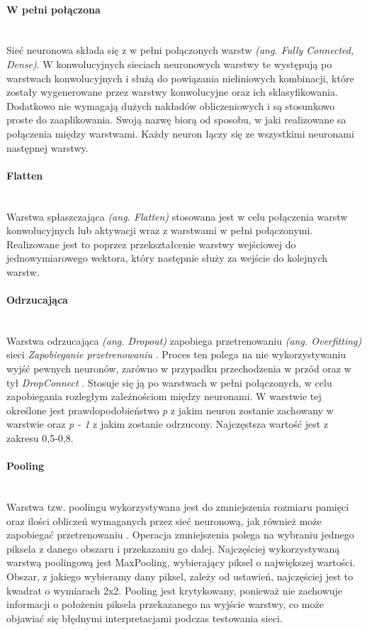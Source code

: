 \paragraph{W pełni połączona} \mbox{}\\
Sieć neuronowa składa się z w pełni połączonych warstw \textit{(ang. Fully Connected, Dense)}.
W konwolucyjnych sieciach neuronowych warstwy te występują po warstwach konwolucyjnych
i służą do powiązania nieliniowych kombinacji, które zostały wygenerowane przez
warstwy konwolucyjne oraz ich sklasyfikowania. Dodatkowo nie wymagają dużych nakładów
obliczeniowych i są stosunkowo proste do zaaplikowania. Swoją nazwę biorą od sposobu, w jaki
realizowane sa połączenia między warstwami. Każdy neuron łączy się ze wszystkimi neuronami
następnej warstwy.

\paragraph{Flatten} \mbox{}\\
Warstwa spłaszczająca \textit{(ang. Flatten)} stosowana jest w celu połączenia warstw
konwolucyjnych lub aktywacji wraz z warstwami w pełni połączonymi. Realizowane jest
to poprzez przekształcenie warstwy wejściowej do jednowymiarowego wektora, który następnie
służy za wejście do kolejnych warstw.

\paragraph{Odrzucająca} \mbox{}\\
Warstwa odrzucająca \textit{(ang. Dropout)} zapobiega przetrenowaniu \textit{(ang. Overfitting)}
sieci \textit{Zapobieganie przetrenowaniu} \cite{DropoutPreventOverfit}.
Proces ten polega na nie wykorzystywaniu wyjść pewnych neuronów, zarówno
w przypadku przechodzenia w przód oraz w tył \textit{DropConnect} \cite{DropConnect}. Stosuje się ją po warstwach w pełni
połączonych, w celu zapobiegania rozległym zależnościom między neuronami. W warstwie
tej określone jest prawdopodobieństwo \textit{p} z jakim neuron zostanie zachowany
w warstwie oraz \textit{p - 1} z jakim zostanie odrzucony. Najczęstsza wartość jest
z zakresu 0,5-0,8.

\paragraph{Pooling} \mbox{}\\
Warstwa tzw. poolingu wykorzystywana jest do zmniejszenia rozmiaru pamięci oraz ilości obliczeń
wymaganych przez sieć neuronową, jak również może zapobiegać przetrenowaniu \cite{CS231n}. Operacja zmniejszenia
polega na wybraniu jednego piksela z danego obszaru i przekazaniu go dalej. Najczęściej wykorzystywaną
warstwą poolingową jest MaxPooling, wybierający piksel o największej wartości. Obszar, z jakiego
wybieramy dany piksel, zależy od ustawień, najczęściej jest to kwadrat o wymiarach 2x2. Pooling
jest krytykowany, ponieważ nie zachowuje informacji o położeniu piksela przekazanego na wyjście
warstwy, co może objawiać się błędnymi interpretacjami podczas testowania sieci.

